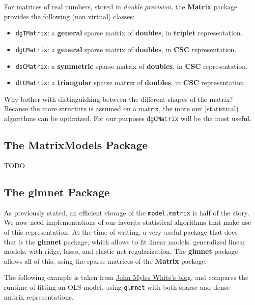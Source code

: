 \documentclass[]{book}
\providecommand{\tightlist}{%
  \setlength{\itemsep}{0pt}\setlength{\parskip}{0pt}}
\theoremstyle{definition}
\theoremstyle{definition}
\theoremstyle{definition}
\theoremstyle{remark}
\begin{document}
For matrices of real numbers, stored in \emph{double precision}, the
\textbf{Matrix} package provides the following (non virtual) classes:

\begin{itemize}
\tightlist
\item
  \texttt{dgTMatrix}: a \textbf{general} sparse matrix of
  \textbf{doubles}, in \textbf{triplet} representation.
\item
  \texttt{dgCMatrix}: a \textbf{general} sparse matrix of
  \textbf{doubles}, in \textbf{CSC} representation.
\item
  \texttt{dsCMatrix}: a \textbf{symmetric} sparse matrix of
  \textbf{doubles}, in \textbf{CSC} representation.
\item
  \texttt{dtCMatrix}: a \textbf{triangular} sparse matrix of
  \textbf{doubles}, in \textbf{CSC} representation.
\end{itemize}

Why bother with distinguishing between the different shapes of the
matrix? Because the more structure is assumed on a matrix, the more our
(statistical) algorithms can be optimized. For our purposes
\texttt{dgCMatrix} will be the most useful.

\subsection{The MatrixModels Package}\label{the-matrixmodels-package}

TODO

\subsection{The glmnet Package}\label{the-glmnet-package}

As previously stated, an efficient storage of the \texttt{model.matrix}
is half of the story. We now need implementations of our favorite
statistical algorithms that make use of this representation. At the time
of writing, a very useful package that does that is the \textbf{glmnet}
package, which allows to fit linear models, generalized linear models,
with ridge, lasso, and elastic net regularization. The \textbf{glmnet}
package allows all of this, using the sparse matrices of the
\textbf{Matrix} package.

The following example is taken from
\href{http://www.johnmyleswhite.com/notebook/2011/10/31/using-sparse-matrices-in-r/}{John
Myles White's blog}, and compares the runtime of fitting an OLS model,
using \texttt{glmnet} with both sparse and dense matrix representations.
\end{document}
